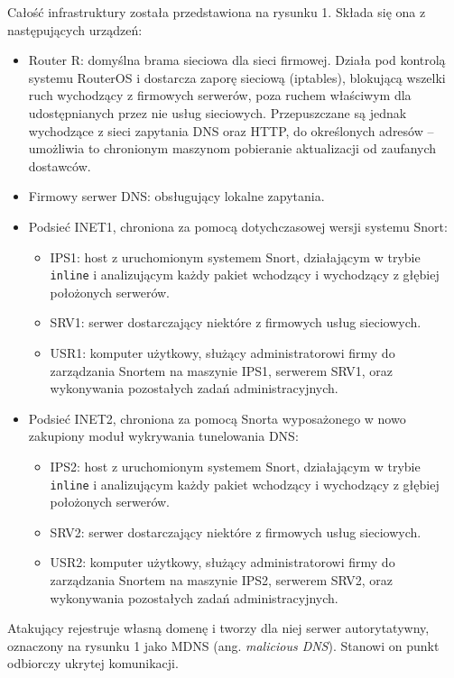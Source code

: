 \documentclass{eiti-raport}
\begin{document}
Całość infrastruktury została przedstawiona na rysunku 1. Składa się ona z następujących urządzeń: 
\begin{itemize}
	\item Router R: domyślna brama sieciowa dla sieci firmowej. Działa pod kontrolą systemu RouterOS i dostarcza zaporę sieciową (iptables), blokującą wszelki ruch wychodzący z firmowych serwerów, poza ruchem właściwym dla udostępnianych przez nie usług sieciowych. Przepuszczane są jednak  wychodzące z sieci zapytania DNS oraz HTTP, do określonych adresów -- umożliwia to chronionym maszynom pobieranie aktualizacji od zaufanych dostawców. 
	\item Firmowy serwer DNS: obsługujący lokalne zapytania. 
	\item Podsieć INET1, chroniona za pomocą dotychczasowej wersji systemu Snort:
	\begin{itemize}
		\item IPS1: host z uruchomionym systemem Snort, działającym w trybie \texttt{inline} i analizującym każdy pakiet wchodzący i wychodzący z głębiej położonych serwerów. 
		\item SRV1: serwer dostarczający niektóre z firmowych usług sieciowych. 
		\item USR1: komputer użytkowy, służący administratorowi firmy do zarządzania Snortem na maszynie IPS1, serwerem SRV1, oraz wykonywania pozostałych zadań administracyjnych. 
	\end{itemize}
	\item Podsieć INET2, chroniona za pomocą Snorta wyposażonego w nowo zakupiony moduł wykrywania tunelowania DNS:
	\begin{itemize}
		\item IPS2: host z uruchomionym systemem Snort, działającym w trybie \texttt{inline} i analizującym każdy pakiet wchodzący i wychodzący z głębiej położonych serwerów. 
		\item SRV2: serwer dostarczający niektóre z firmowych usług sieciowych. 
		\item USR2: komputer użytkowy, służący administratorowi firmy do zarządzania Snortem na maszynie IPS2, serwerem SRV2, oraz wykonywania pozostałych zadań administracyjnych. 
	\end{itemize}
\end{itemize}
Atakujący rejestruje własną domenę i tworzy dla niej serwer autorytatywny, oznaczony na rysunku 1 jako MDNS (ang. \textit{malicious DNS}). Stanowi on punkt odbiorczy ukrytej komunikacji. 
\end{document}

